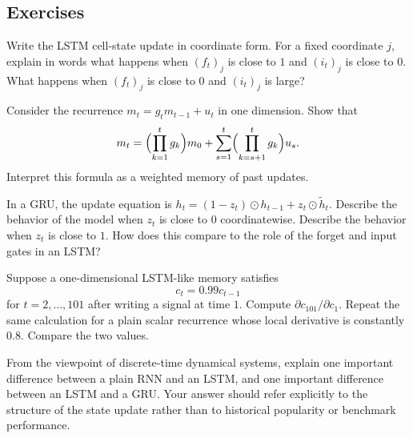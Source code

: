 
\subsection*{Exercises}

\begin{exercise}
Write the LSTM cell-state update in coordinate form.
For a fixed coordinate $j$, explain in words what happens when $(f_t)_j$ is close to $1$ and $(i_t)_j$ is close to $0$.
What happens when $(f_t)_j$ is close to $0$ and $(i_t)_j$ is large?
\end{exercise}

\begin{exercise}
Consider the recurrence $m_t=g_t m_{t-1}+u_t$ in one dimension.
Show that
\[
 m_t = \Bigl(\prod_{k=1}^{t} g_k\Bigr)m_0 + \sum_{s=1}^{t}\Bigl(\prod_{k=s+1}^{t} g_k\Bigr)u_s.
\]
Interpret this formula as a weighted memory of past updates.
\end{exercise}

\begin{exercise}
In a GRU, the update equation is $h_t=(1-z_t)\odot h_{t-1}+z_t\odot \widetilde h_t$.
Describe the behavior of the model when $z_t$ is close to $0$ coordinatewise.
Describe the behavior when $z_t$ is close to $1$.
How does this compare to the role of the forget and input gates in an LSTM?
\end{exercise}

\begin{exercise}
Suppose a one-dimensional LSTM-like memory satisfies
\[
 c_t = 0.99 c_{t-1}
\]
for $t=2,\dots,101$ after writing a signal at time $1$.
Compute $\partial c_{101}/\partial c_1$.
Repeat the same calculation for a plain scalar recurrence whose local derivative is constantly $0.8$.
Compare the two values.
\end{exercise}

\begin{exercise}
From the viewpoint of discrete-time dynamical systems, explain one important difference between a plain RNN and an LSTM, and one important difference between an LSTM and a GRU.
Your answer should refer explicitly to the structure of the state update rather than to historical popularity or benchmark performance.
\end{exercise}

